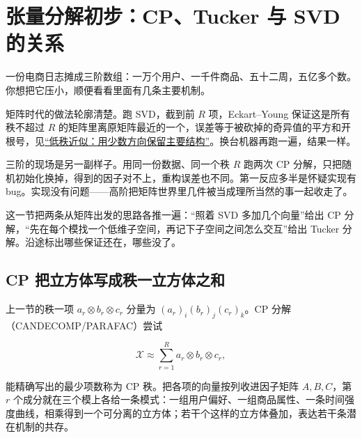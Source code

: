 \section{张量分解初步：CP、Tucker 与 SVD 的关系}
\label{sec:03-Linear-Algebra/09-Tensors/02}

一份电商日志摊成三阶数组：一万个用户、一千件商品、五十二周，五亿多个数。你想把它压小，顺便看看里面有几条主要机制。

矩阵时代的做法轮廓清楚。跑 SVD，截到前 \(R\) 项，Eckart--Young 保证这是所有秩不超过 \(R\) 的矩阵里离原矩阵最近的一个，误差等于被砍掉的奇异值的平方和开根号，见\hyperref[sec:03-Linear-Algebra/07-SVD-and-Data-Applications/03]{``低秩近似：用少数方向保留主要结构''}。换台机器再跑一遍，结果一样。

三阶的现场是另一副样子。用同一份数据、同一个秩 \(R\) 跑两次 CP 分解，只把随机初始化换掉，得到的因子对不上，重构误差也不同。第一反应多半是怀疑实现有 bug。实现没有问题——高阶把矩阵世界里几件被当成理所当然的事一起收走了。

这一节把两条从矩阵出发的思路各推一遍：``照着 SVD 多加几个向量''给出 CP 分解，``先在每个模找一个低维子空间，再记下子空间之间怎么交互''给出 Tucker 分解。沿途标出哪些保证还在，哪些没了。

\subsection{CP 把立方体写成秩一立方体之和}

上一节的秩一项 \(a_r\otimes b_r\otimes c_r\) 分量为 \((a_r)_i(b_r)_j(c_r)_k\)。CP 分解（CANDECOMP/PARAFAC）尝试

\[
\mathcal X\approx\sum_{r=1}^{R}a_r\otimes b_r\otimes c_r ,
\]

能精确写出的最少项数称为 CP 秩。把各项的向量按列收进因子矩阵 \(A,B,C\)，第 \(r\) 个成分就在三个模上各给一条模式：一组用户偏好、一组商品属性、一条时间强度曲线，相乘得到一个可分离的立方体；若干个这样的立方体叠加，表达若干条潜在机制的共存。

